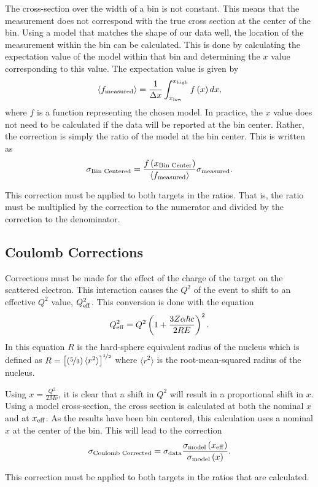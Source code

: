 The cross-section over the width of a bin is not constant. This means that the measurement does not correspond with the true cross section at the center of the bin. Using a model that matches the shape of our data well, the location of the measurement within the bin can be calculated. This is done by calculating the expectation value of the model within that bin and determining the $x$ value corresponding to this value. The expectation value is given by
\begin{equation}
	\langle f_{\rm measured}\rangle = \frac{1}{\Delta x}\int_{x_{\rm low}}^{x_{\rm high}} f\left( x \right) dx,
\end{equation}
where $f$ is a function representing the chosen model. In practice, the $x$ value does not need to be calculated if the data will be reported at the bin center. Rather, the correction is simply the ratio of the model at the bin center. This is written as
\begin{equation}
	\sigma_{\textrm{Bin Centered}} = \frac{f\left(x_{\textrm{Bin Center}}\right)}{\langle f_{\rm measured}\rangle} \sigma_{\rm measured}.
\end{equation}

This correction must be applied to both targets in the ratios. That is, the ratio must be multiplied by the correction to the numerator and divided by the correction to the denominator.\cite{wtsydp}

\subsection{Coulomb Corrections}

Corrections must be made for the effect of the charge of the target on the scattered electron. This interaction causes the $Q^2$ of the event to shift to an effective $Q^2$ value, $Q^2_{\rm eff}$. This conversion is done with the equation
\begin{equation}
	Q^2_{\rm eff} = Q^2 \left(1 + \frac{3Z\alpha\hbar c}{2RE}\right)^{2}.
\end{equation}
In this equation $R$ is the hard-sphere equivalent radius of the nucleus which is defined as $R=\left[\left(\nicefrac{5}{3}\right) \langle r^{2}\rangle\right]^{\nicefrac{1}{2}}$ where $\langle r^2\rangle$ is the root-mean-squared radius of the nucleus.\cite{coulomb}

Using $x=\frac{Q^2}{2M\nu}$, it is clear that a shift in $Q^2$ will result in a proportional shift in $x$. Using a model cross-section, the cross section is calculated at both the nominal $x$ and at $x_{\rm eff}$. As the results have been bin centered, this calculation uses a nominal $x$ at the center of the bin. This will lead to the correction
\begin{equation}
	\sigma_{\textrm{Coulomb Corrected}} = \sigma_{\rm data} \frac{\sigma_{\rm model}\left(x_{\rm eff}\right)}{\sigma_{\rm model}\left(x\right)}.
\end{equation}

This correction must be applied to both targets in the ratios that are calculated.